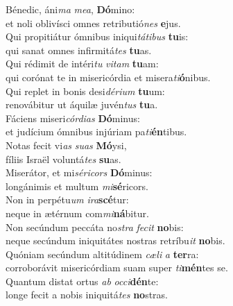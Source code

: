 \evenverse Bénedic, áni\textit{ma} \textit{me}\textit{a}, \textbf{Dó}mino:~\*\\
\evenverse et noli oblivísci omnes retributió\textit{nes} \textbf{e}jus.\\
\oddverse Qui propitiátur ómnibus iniqui\textit{tá}\textit{ti}\textit{bus} \textbf{tu}is:~\*\\
\oddverse qui sanat omnes infirmitá\textit{tes} \textbf{tu}as.\\
\evenverse Qui rédimit de intéri\textit{tu} \textit{vi}\textit{tam} \textbf{tu}am:~\*\\
\evenverse qui corónat te in misericórdia et misera\textit{ti}\textbf{ó}nibus.\\
\oddverse Qui replet in bonis desi\textit{dé}\textit{ri}\textit{um} \textbf{tu}um:~\*\\
\oddverse renovábitur ut áquilæ juvén\textit{tus} \textbf{tu}a.\\
\evenverse Fáciens miseri\textit{cór}\textit{di}\textit{as} \textbf{Dó}minus:~\*\\
\evenverse et judícium ómnibus injúriam pa\textit{ti}\textbf{én}tibus.\\
\oddverse Notas fecit vi\textit{as} \textit{su}\textit{as} \textbf{Mó}ysi,~\*\\
\oddverse fíliis Israël voluntá\textit{tes} \textbf{su}as.\\
\evenverse Miserátor, et mi\textit{sé}\textit{ri}\textit{cors} \textbf{Dó}minus:~\*\\
\evenverse longánimis et multum \textit{mi}\textbf{sé}ricors.\\
\oddverse Non in perpétu\textit{um} \textit{i}\textit{ra}\textbf{scé}tur:~\*\\
\oddverse neque in ætérnum com\textit{mi}\textbf{ná}bitur.\\
\evenverse Non secúndum peccáta no\textit{stra} \textit{fe}\textit{cit} \textbf{no}bis:~\*\\
\evenverse neque secúndum iniquitátes nostras retríbu\textit{it} \textbf{no}bis.\\
\oddverse Quóniam secúndum altitúdinem \textit{cæ}\textit{li} \textit{a} \textbf{ter}ra:~\*\\
\oddverse corroborávit misericórdiam suam super \textit{ti}\textbf{mén}tes se.\\
\evenverse Quantum distat ortus \textit{ab} \textit{oc}\textit{ci}\textbf{dén}te:~\*\\
\evenverse longe fecit a nobis iniquitá\textit{tes} \textbf{no}stras.\\
